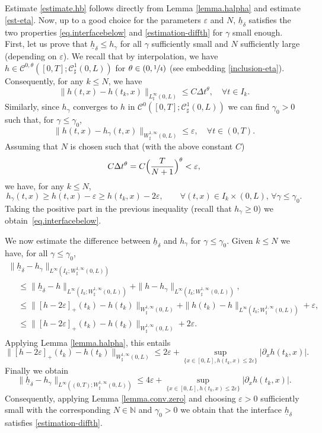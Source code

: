 \documentclass[11pt]{article}
\let\mathcal\mathscr
\theoremstyle{remark}
\theoremstyle{definition}
\newcommand{\Natural}{\mathbb{N}}
\newcommand{\hb}{{\underline{h}}}
\begin{document}
Estimate \eqref{estimate.hb} follows directly from Lemma \ref{lemma.halpha} and estimate \eqref{est-eta}.
Now, up to a good choice for the parameters $\varepsilon$ and $N$, $\hb_{\delta}$ satisfies the two
properties \eqref{eq.interfacebelow} and \eqref{estimation-diffth} for $\gamma$ small enough. First, let us prove that $\hb_{\delta}\leq h_{\gamma}$ for all $\gamma$ sufficiently small and $N$ sufficiently large (depending on $\varepsilon$). We recall that by interpolation, we have $h \in \mathcal{C}^{0,\theta}([0,T];\mathcal{C}^{1}_{\sharp}(0,L))$ for $\theta\in(0,\sfrac{1}{4})$ (see embedding \eqref{inclusion-eta}). Consequently, for any $k \leq N$, we have
\[
\|h(t,x) - h(t_{k},x)\|_{L^{\infty}_{\sharp}(0,L)} \leq C \Delta t^{\theta}, \quad \forall t \in I_k.
\]
Similarly, since $h_{\gamma}$ converges to $h$ in $\mathcal{C}^{0}([0,T];\mathcal{C}_\sharp^{1}(0,L))$ we can find $\gamma_0 >0$ such that, for $\gamma \leq \gamma_0$,
\[
\|h(t,x) - h_{\gamma}(t,x)\|_{W^{1,\infty}_{\sharp}(0,L)} \leq \varepsilon, \quad \forall t \in (0,T).
\]
Assuming that $N$ is chosen such that (with the above constant $C$)
\[
C \Delta t^{\theta}=C \Bigl(\dfrac T{N+1} \Bigr)^{\theta} < \varepsilon,
\]
we have, for any $k \leq N$,
\[
h_{\gamma}(t,x)\geq h(t,x)-\varepsilon\geq h(t_{k},x)-2\varepsilon, \qquad \forall(t,x)\in I_{k}\times(0,L),\,\forall \gamma\leq \gamma_{0}.
\]
Taking the positive part in the previous inequality (recall that $h_{\gamma}\!\geq\!0$) we obtain~\eqref{eq.interfacebelow}.

We now estimate the difference between $\hb_{\delta}$ and $h_{\gamma}$ for $\gamma \leq \gamma_0$.
Given $k \leq N$ we have, for all $\gamma \leq \gamma_0$,\vspace*{-3pt}
\begin{multline*}
\| \hb_{\delta}- h_\gamma\|_{L^\infty(I_k; W_\sharp^{1, \infty}(0, L))}\\
\begin{aligned}
&\leq \| \hb_{\delta}- h\|_{L^\infty(I_k; W_\sharp^{1, \infty}(0, L))}
+ \| h- h_\gamma\|_{L^\infty(I_k; W_\sharp^{1, \infty}(0, L))},\\
&\leq \| [h-2\varepsilon]_+(t_k)- h(t_k)\|_{W_\sharp^{1, \infty}(0, L)}
+\| h({t_k})- h\|_{L^\infty(I_k; W_\sharp^{1, \infty}(0, L))}
+ \varepsilon,\\
&\leq \| [h-2\varepsilon]_+(t_k)- h(t_k)\|_{W_\sharp^{1, \infty}(0, L)}
+2\varepsilon.
\end{aligned}
\end{multline*}
Applying Lemma \ref{lemma.halpha}, this entails
\[
\| [h-2\varepsilon]_+(t_k)- h(t_k)\|_{W_\sharp^{1, \infty}(0, L)}\leq 2\varepsilon +\sup_{\{x\in [0, L], h(t_k,x)\leq 2\varepsilon\}}\vert\partial_x h(t_k,x)\vert.
\]
Finally we obtain
\[
\| \hb_{\delta}- h_\gamma\|_{L^\infty((0,T); W_\sharp^{1, \infty}(0, L))}\leq 4 \varepsilon + \sup_{\{x\in [0, L], h(t_k, x)\leq 2\varepsilon\}}\vert\partial_x h(t_k,x )\vert. 
\]
Consequently, applying Lemma \ref{lemma.conv.zero} and choosing $\varepsilon>0$ sufficiently small with the corresponding $N \in\Natural$ and $\gamma_{0}>0$ we obtain that the interface $\hb_{\delta}$ satisfies \eqref{estimation-diffth}.
\end{document}
